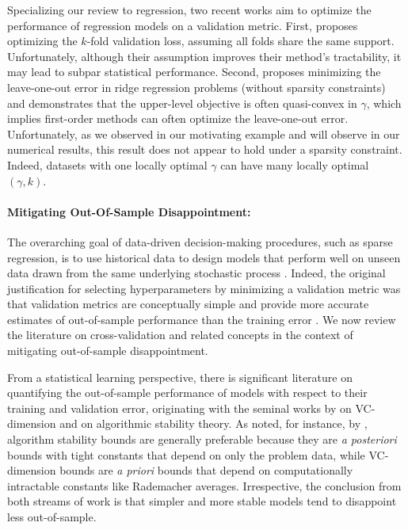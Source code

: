 \documentclass[opre,nonblindrev]{informs3} %
\begin{document}
Specializing our review to regression, two recent works aim to optimize the performance of regression models on a validation metric. First, \cite{takano2020best} proposes optimizing the $k$-fold validation loss, assuming all folds share the same support. Unfortunately, although their assumption improves their method's tractability, it may lead to subpar statistical performance. Second, \citet{stephenson2021can} proposes minimizing the leave-one-out error in ridge regression problems (without sparsity constraints) and demonstrates that the upper-level objective is often quasi-convex in $\gamma$, which implies first-order methods can often optimize the leave-one-out error. Unfortunately, as we observed in our motivating example and will observe in our numerical results, this result does not appear to hold under a sparsity constraint. Indeed, datasets with one locally optimal $\gamma$ can have many locally optimal $(\gamma, k)$. 

\paragraph{Mitigating Out-Of-Sample Disappointment: } The overarching goal of data-driven decision-making procedures, such as sparse regression, is to use historical data to design models that perform well on unseen data drawn from the same underlying stochastic process \citep[][]{king1991epi}. Indeed, %
the original justification for selecting hyperparameters by minimizing a validation metric was that validation metrics are conceptually simple and provide more accurate estimates of out-of-sample performance than the training error \citep{stone1974cross}. We now review the literature on cross-validation and related concepts in the context of mitigating out-of-sample disappointment.%

From a statistical learning perspective, there is significant literature %
on quantifying the out-of-sample performance of models with respect to their training and validation error, originating with the seminal works by \cite{vapnik1999overview} on VC-dimension and \cite{bousquet2002stability} on algorithmic stability theory. %
As noted, for instance, by \cite{ban2019big}, algorithm stability bounds are generally preferable because they are \textit{a posteriori} bounds with tight constants that depend on only the problem data, while VC-dimension bounds are \textit{a priori} bounds that depend on computationally intractable constants like Rademacher averages. Irrespective, the conclusion from both streams of work is that simpler and more stable models tend to disappoint less out-of-sample. 
\end{document}
